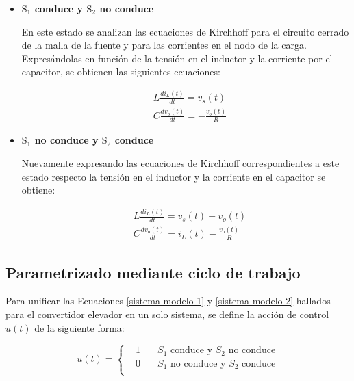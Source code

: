 \begin{itemize}
    \item \textbf{$\boldsymbol{\mathrm{S_1}}$ conduce y $\boldsymbol{\mathrm{S_2}}$ no conduce}
    
    En este estado se analizan las ecuaciones de Kirchhoff para el circuito cerrado de la malla de la fuente y para las corrientes en el nodo de la carga. Expresándolas en función de la tensión en el inductor y la corriente por el capacitor, se obtienen las siguientes ecuaciones:

    \begin{equation}
        \begin{split}
          & L \frac{di_L(t)}{dt} = v_s(t) 
          \\
          & C \frac{dv_o(t)}{dt} = - \frac{v_o(t)}{R}
        \end{split}
        \label{sistema-modelo-1}
      \end{equation}

      \item \textbf{$\boldsymbol{\mathrm{S_1}}$ no conduce y $\boldsymbol{\mathrm{S_2}}$ conduce}
      
      Nuevamente expresando las ecuaciones de Kirchhoff correspondientes a este estado respecto la tensión en el inductor y la corriente en el capacitor se obtiene:
      
    \begin{equation}
        \begin{split}
          & L \frac{di_L(t)}{dt} = v_s(t) - v_o(t)
          \\
          & C \frac{dv_o(t)}{dt} = i_L(t)- \frac{v_o(t)}{R}
        \end{split}
        \label{sistema-modelo-2}
      \end{equation}
\end{itemize}

\subsection{Parametrizado mediante ciclo de trabajo}

Para unificar las Ecuaciones \ref{sistema-modelo-1} y \ref{sistema-modelo-2} hallados para el convertidor elevador en un solo sistema, se define la acción de control $u(t)$ de la siguiente forma:

\[
  u(t) = \left\{\begin{alignedat}{2}
    & 1 &\quad  \text{$S_1$ conduce y $S_2$ no conduce} \\
    & 0 &\quad  \text{$S_1$ no conduce y $S_2$ conduce} \\
  \end{alignedat}\right.
\]

